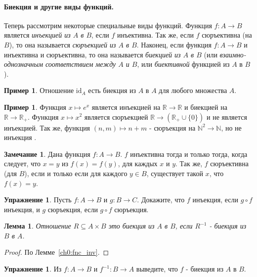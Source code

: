 \documentclass[12pt,notitlepage]{article}
\theoremstyle{plain}
\newtheorem{lemma}[thm]{Лемма}
\theoremstyle{definition}
\newtheorem{exc}[thm]{Упражнение}
\newtheorem{exm}[thm]{Пример}
\newtheorem{rem}[thm]{Замечание}
\theoremstyle{plain}
\newcommand{\N}{\mathbb{N}}
\newcommand{\R}{\mathbb{R}}
\newcommand{\sbs}{\subseteq}
\newcommand{\id}{\mathrm{id}}
\newcommand{\1}{\mathbf{1}}
\newcommand{\0}{\mathbf{0}}
\newcommand{\mcomm}[1]{}
\begin{document}
\paragraph{Биекция и другие виды функций.} Теперь рассмотрим некоторые специальные виды функций. Функция $f\colon A \to B$ является \emph{инъекцией из $A$ в $B$}, если $f$ инъективна. Так же, если $f$ сюръективна (на $B$), то она называется \emph{сюръекцией из $A$ в $B$}. Наконец, если функция $f\colon A \to B$ и инъективна и сюръективна, то она называется \emph{биекцией из $A$ в $B$} (или \emph{взаимно-однозначным соответствием между $A$ и $B$}, или \emph{биективной} функцией из $A$ в $B$).

\begin{exm}
	Отношение $\id_A$ есть биекция из $A$ в $A$ для любого множества $A$.
\end{exm}

\begin{exm}
	Функция $x \mapsto e^x$ является инъекцией на $\R \to \R$ и биекцией на $\R \to \R_+$. Функция $x \mapsto x^2$ является сюръекцией $\R \to (\R_+ \cup \{0\})$ и не является инъекцией. Так же, функция $(n,m) \mapsto n + m$ - сюръекция на $\N^2 \to \N$, но не инъекция . 
\end{exm}

\begin{rem}
	Дана функция $f\colon A \to B$. $f$ инъективна тогда и только тогда, когда следует, что $x = y$ из $f(x) = f(y)$, для каждых $x$ и $y$. Так же, $f$ сюръективна (для $B$), если и только если для каждого $y \in B$, существует такой $x$, что $f(x) = y$.
\end{rem}
\mcomm{This point may be not that obvious for some students. It makes sense to give a detailed proof.}

\begin{exc}
	Пусть $f\colon A \to B$ и $g\colon B \to C$. Докажите, что $f$ инъекция, если $g \circ f$ инъекция, и $g$ сюръекция, если $g \circ f$ сюръекция.
\end{exc}

\begin{lemma}\label{ch0:bi_inv}
	Отношение $R \sbs A \times B$ это биекция из $A$ в $B$, если $R^{-1}$ - биекция из $B$ в $A$.
\end{lemma}
\begin{proof} По Лемме~\ref{ch0:fnc_inv}.
\end{proof}

\begin{exc}
	Из $f\colon A \to B$ и $f^{-1}\colon B \to A$ выведите, что $f$ - биекция из $A$ в $B$.
\end{exc}
\end{document}
